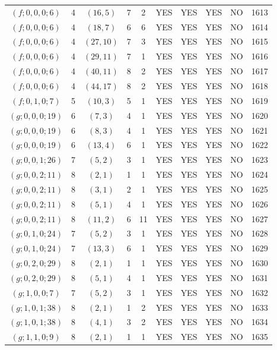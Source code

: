 \begin{longtable}{|c|c|c|c|c|c|c|c|c|c|}
$(f; 0, 0, 0; 6)$ & 4 & $(16, 5)$ & 7 & 2 & YES & YES & YES & NO & 1613\\
$(f; 0, 0, 0; 6)$ & 4 & $(18, 7)$ & 6 & 6 & YES & YES & YES & NO & 1614\\
$(f; 0, 0, 0; 6)$ & 4 & $(27, 10)$ & 7 & 3 & YES & YES & YES & NO & 1615\\
$(f; 0, 0, 0; 6)$ & 4 & $(29, 11)$ & 7 & 1 & YES & YES & YES & NO & 1616\\
$(f; 0, 0, 0; 6)$ & 4 & $(40, 11)$ & 8 & 2 & YES & YES & YES & NO & 1617\\
$(f; 0, 0, 0; 6)$ & 4 & $(44, 17)$ & 8 & 2 & YES & YES & YES & NO & 1618\\
$(f; 0, 1, 0; 7)$ & 5 & $(10, 3)$ & 5 & 1 & YES & YES & YES & NO & 1619\\
$(g; 0, 0, 0; 19)$ & 6 & $(7, 3)$ & 4 & 1 & YES & YES & YES & NO & 1620\\
$(g; 0, 0, 0; 19)$ & 6 & $(8, 3)$ & 4 & 1 & YES & YES & YES & NO & 1621\\
$(g; 0, 0, 0; 19)$ & 6 & $(13, 4)$ & 6 & 1 & YES & YES & YES & NO & 1622\\
$(g; 0, 0, 1; 26)$ & 7 & $(5, 2)$ & 3 & 1 & YES & YES & YES & NO & 1623\\
$(g; 0, 0, 2; 11)$ & 8 & $(2, 1)$ & 1 & 1 & YES & YES & YES & NO & 1624\\
$(g; 0, 0, 2; 11)$ & 8 & $(3, 1)$ & 2 & 1 & YES & YES & YES & NO & 1625\\
$(g; 0, 0, 2; 11)$ & 8 & $(5, 1)$ & 4 & 1 & YES & YES & YES & NO & 1626\\
$(g; 0, 0, 2; 11)$ & 8 & $(11, 2)$ & 6 & 11 & YES & YES & YES & NO & 1627\\
$(g; 0, 1, 0; 24)$ & 7 & $(5, 2)$ & 3 & 1 & YES & YES & YES & NO & 1628\\
$(g; 0, 1, 0; 24)$ & 7 & $(13, 3)$ & 6 & 1 & YES & YES & YES & NO & 1629\\
$(g; 0, 2, 0; 29)$ & 8 & $(2, 1)$ & 1 & 1 & YES & YES & YES & NO & 1630\\
$(g; 0, 2, 0; 29)$ & 8 & $(5, 1)$ & 4 & 1 & YES & YES & YES & NO & 1631\\
$(g; 1, 0, 0; 7)$ & 7 & $(5, 2)$ & 3 & 1 & YES & YES & YES & NO & 1632\\
$(g; 1, 0, 1; 38)$ & 8 & $(2, 1)$ & 1 & 2 & YES & YES & YES & NO & 1633\\
$(g; 1, 0, 1; 38)$ & 8 & $(4, 1)$ & 3 & 2 & YES & YES & YES & NO & 1634\\
$(g; 1, 1, 0; 9)$ & 8 & $(2, 1)$ & 1 & 1 & YES & YES & YES & NO & 1635\\

\end{longtable}
